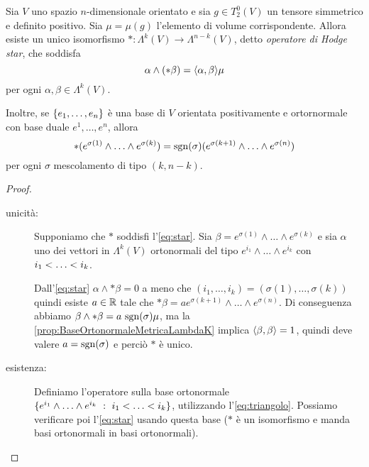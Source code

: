 \begin{proposition} 
	Sia $V$ uno spazio $n$-dimensionale orientato e sia $g\in T^0_2(V)$ un tensore simmetrico e definito positivo.
	Sia $\mu=\mu(g)$ l'elemento di volume corrispondente.
	Allora esiste un unico isomorfismo $*:\Lambda^k(V) \to \Lambda^{n-k}(V)$, detto \emph{operatore di Hodge star}, che soddisfa
	\begin{equation} \label{eq:star}
	 \alpha \wedge (* \beta)= \Scal \alpha\beta \mu
	\end{equation}
	per ogni $\alpha,\beta \in\Lambda^k(V)$.
	
	Inoltre, se $\{\seqb en, \}$ è una base di $V$ orientata positivamente e ortornormale con base duale $e^1, \dots ,e^n$, allora
	\begin{equation}\label{eq:triangolo}
	*(e^{\sigma(1)}\wedge\ldots\wedge e^{\sigma(k)}) = \sgn(\sigma) (e^{\sigma(k+1)}\wedge\ldots\wedge e^{\sigma(n)})
	\end{equation}
	per ogni $\sigma$ mescolamento di tipo $(k,n-k)$.
\end{proposition}
\begin{proof} %
	\begin{description}
		\item [unicità:] Supponiamo che $*$ soddisfi l'\cref{eq:star}. Sia $\beta = e^{\sigma(1)} \wedge\ldots\wedge e^{\sigma(k)}$ e sia $\alpha$ uno dei vettori in $\Lambda^k(V)$ ortonormali del tipo $e^{i_1}\wedge\ldots\wedge e^{i_k}$ con $\seqb ik<$.
		
		Dall'\cref{eq:star} $\alpha \wedge * \beta=0$ a meno che $(i_1, \ldots,i_k)=(\sigma(1),\ldots,\sigma(k))$
		quindi esiste $a\in\R$ tale che $*\beta = a e^{\sigma(k+1)} \wedge\ldots\wedge e^{\sigma(n)}$.
		Di conseguenza abbiamo $\beta\wedge * \beta = a\ \sgn(\sigma) \mu$, ma la \cref{prop:BaseOrtonormaleMetricaLambdaK} implica $\Scal \beta\beta=1$, quindi deve valere $a = \sgn(\sigma)$ e perciò $*$ è unico.
		
		\item [esistenza:] Definiamo l'operatore sulla base ortonormale $\{e^{i_1}\wedge\ldots\wedge e^{i_k} \suchthat \seqb ik <\}$, utilizzando l'\cref{eq:triangolo}. Possiamo verificare poi l'\cref{eq:star} usando questa base ($*$ è un isomorfismo e manda basi ortonormali in basi ortonormali). %
	\end{description}
\end{proof}

